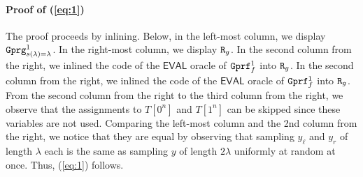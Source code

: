 \documentclass[a4paper,table,dvipsnames]{article}
\theoremstyle{definition}
\newcommand{\M}[1]{\ensuremath{\text{\texttt{#1}}}}
\renewcommand{\O}[1]{\ensuremath{\mathsf{#1}}}
\begin{document}
\paragraph{Proof of (\ref{eq:1})} The proof proceeds by inlining. Below, in the left-most column, we display $\M{Gprg}_{s(\lambda)=\lambda}^1$. In the right-most column, we display $\M{R}_g$. In the second column from the right, we inlined the code of the $\O{EVAL}$ oracle of
$\M{Gprf}_f^1$ into $\M{R}_g$. 
In the second column from the right, we inlined the code of the $\O{EVAL}$ oracle of
$\M{Gprf}_f^1$ into $\M{R}_g$. From the second column from the right to the third column from the right, we observe that the assignments
to $T[0^n]$ and $T[1^n]$ can be skipped since these variables are not used. Comparing the left-most column and the 2nd column from the right, we notice that they are equal by observing that sampling $y_\ell$ and $y_r$ of length $\lambda$ each is the same as sampling $y$ of length $2\lambda$ uniformly at random at once.
Thus, (\ref{eq:1}) follows.
\end{document}

